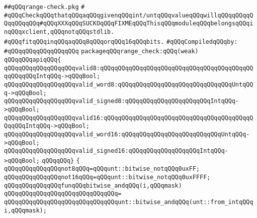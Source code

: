 \label{src/lib/std/2d/range-check.pkg}
\verb|##qQQqrange-check.pkg|\newline
\verb|#|\newline
\verb|#qQQqCheckqQQqthatqQQqaqQQqgivenqQQqint/untqQQqvalueqQQqwillqQQqqQQqqQQqqQQqqQQq#qQQqXXXqQQqSUCKOqQQqFIXMEqQQqThisqQQqmoduleqQQqbelongsqQQqinqQQqxclient,qQQqnotqQQqstdlib.|\newline
\verb|#qQQqfitqQQqinqQQqaqQQq8qQQqorqQQq16qQQqbits.|\newline
\newline
\verb|#qQQqCompiledqQQqby:|\newline
\verb|#qQQqqQQqqQQqqQQqqQQq|\newline
\newline
\verb|packageqQQqrange_check:qQQq(weak)|\newline
\verb|qQQqqQQqapiqQQq{|\newline
\verb|qQQqqQQqqQQqqQQqqQQqvalid8:qQQqqQQqqQQqqQQqqQQqqQQqqQQqqQQqqQQqqQQqqQQqqQQqqQQqIntqQQq->qQQqBool;|\newline
\verb|qQQqqQQqqQQqqQQqqQQqvalid_word8:qQQqqQQqqQQqqQQqqQQqqQQqqQQqqQQqUntqQQq->qQQqBool;|\newline
\verb|qQQqqQQqqQQqqQQqqQQqvalid_signed8:qQQqqQQqqQQqqQQqqQQqqQQqIntqQQq->qQQqBool;|\newline
\verb|qQQqqQQqqQQqqQQqqQQqvalid16:qQQqqQQqqQQqqQQqqQQqqQQqqQQqqQQqqQQqqQQqqQQqqQQqIntqQQq->qQQqBool;|\newline
\verb|qQQqqQQqqQQqqQQqqQQqvalid_word16:qQQqqQQqqQQqqQQqqQQqqQQqqQQqUntqQQq->qQQqBool;|\newline
\verb|qQQqqQQqqQQqqQQqqQQqvalid_signed16:qQQqqQQqqQQqqQQqqQQqIntqQQq->qQQqBool;|\newline
\newline
\verb|qQQqqQQq}|\newline
\newline
\verb|{|\newline
\verb|qQQqqQQqqQQqqQQqnot8qQQq=qQQqunt::bitwise_notqQQq0uxFF;|\newline
\verb|qQQqqQQqqQQqqQQqnot16qQQq=qQQqunt::bitwise_notqQQq0uxFFFF;|\newline
\newline
\verb|qQQqqQQqqQQqqQQqfunqQQqbitwise_andqQQq(i,qQQqmask)|\newline
\verb|qQQqqQQqqQQqqQQqqQQqqQQqqQQqqQQq=|\newline
\verb|qQQqqQQqqQQqqQQqqQQqqQQqqQQqqQQqunt::bitwise_andqQQq(unt::from_intqQQqi,qQQqmask);|\newline
